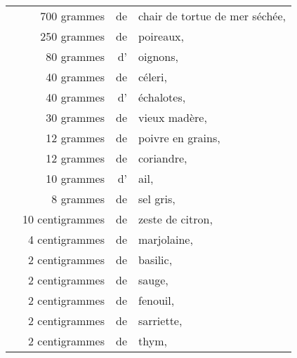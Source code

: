\setlength\tabcolsep{.1em}
\footnotesize
\begin{longtable}{rrrrp{16em}}   
  &      \multicolumn{2}{r}{700 grammes} & de & chair de tortue de mer séchée,                            \\
  &      \multicolumn{2}{r}{250 grammes} & de & poireaux,                                                 \\
  &       \multicolumn{2}{r}{80 grammes} & d' & oignons,                                                  \\
  &       \multicolumn{2}{r}{40 grammes} & de & céleri,                                                   \\
  &       \multicolumn{2}{r}{40 grammes} & d' & échalotes,                                                \\
  &       \multicolumn{2}{r}{30 grammes} & de & vieux madère,                                             \\
  &       \multicolumn{2}{r}{12 grammes} & de & poivre en grains,                                         \\
  &       \multicolumn{2}{r}{12 grammes} & de & coriandre,                                                \\
  &       \multicolumn{2}{r}{10 grammes} & d' & ail,                                                      \\
  &        \multicolumn{2}{r}{8 grammes} & de & sel gris,                                                 \\
  &  \multicolumn{2}{r}{10 centigrammes} & de & zeste de citron,                                          \\
  &   \multicolumn{2}{r}{4 centigrammes} & de & marjolaine,                                               \\
  &   \multicolumn{2}{r}{2 centigrammes} & de & basilic,                                                  \\
  &   \multicolumn{2}{r}{2 centigrammes} & de & sauge,                                                    \\
  &   \multicolumn{2}{r}{2 centigrammes} & de & fenouil,                                                  \\
  &   \multicolumn{2}{r}{2 centigrammes} & de & sarriette,                                                \\
  &   \multicolumn{2}{r}{2 centigrammes} & de & thym,                                                     \\

\end{longtable}
